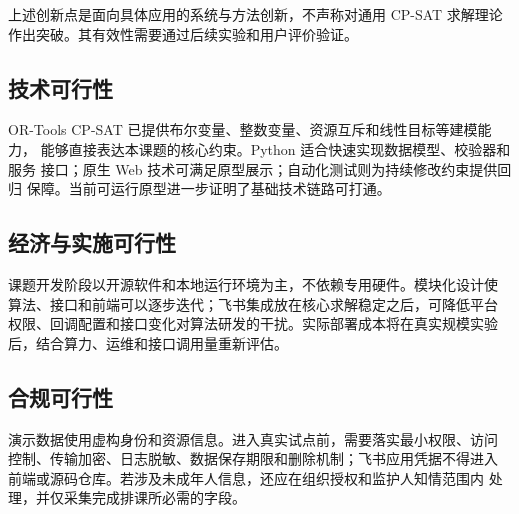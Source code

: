 上述创新点是面向具体应用的系统与方法创新，不声称对通用 CP-SAT 求解理论
作出突破。其有效性需要通过后续实验和用户评价验证。

\subsection{技术可行性}

OR-Tools CP-SAT 已提供布尔变量、整数变量、资源互斥和线性目标等建模能力，
能够直接表达本课题的核心约束。Python 适合快速实现数据模型、校验器和服务
接口；原生 Web 技术可满足原型展示；自动化测试则为持续修改约束提供回归
保障。当前可运行原型进一步证明了基础技术链路可打通。

\subsection{经济与实施可行性}

课题开发阶段以开源软件和本地运行环境为主，不依赖专用硬件。模块化设计使
算法、接口和前端可以逐步迭代；飞书集成放在核心求解稳定之后，可降低平台
权限、回调配置和接口变化对算法研发的干扰。实际部署成本将在真实规模实验
后，结合算力、运维和接口调用量重新评估。

\subsection{合规可行性}

演示数据使用虚构身份和资源信息。进入真实试点前，需要落实最小权限、访问
控制、传输加密、日志脱敏、数据保存期限和删除机制；飞书应用凭据不得进入
前端或源码仓库。若涉及未成年人信息，还应在组织授权和监护人知情范围内
处理，并仅采集完成排课所必需的字段。

